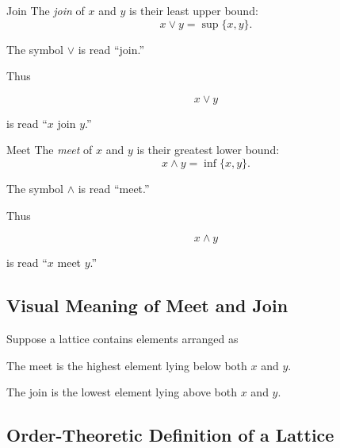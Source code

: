 \begin{definitionbox}{Join}
The \emph{join} of \(x\) and \(y\) is their least upper bound:
\[ x\vee y=\sup\{x,y\}. \]
\end{definitionbox}

The symbol \(\vee\) is read ``join.''

Thus

\[ x\vee y \]

is read ``\(x\) join \(y\).''

\begin{definitionbox}{Meet}
The \emph{meet} of \(x\) and \(y\) is their greatest lower bound:
\[ x\wedge y=\inf\{x,y\}. \]
\end{definitionbox}

The symbol \(\wedge\) is read ``meet.''

Thus

\[ x\wedge y \]

is read ``\(x\) meet \(y\).''

\subsection{Visual Meaning of Meet and Join}
\label{subsec:visual-meet-join}

Suppose a lattice contains elements arranged as

\begin{center}
\end{center}

The meet is the highest element lying below both \(x\) and \(y\).

The join is the lowest element lying above both \(x\) and \(y\).

\subsection{Order-Theoretic Definition of a Lattice}
\label{subsec:order-lattice-definition}

